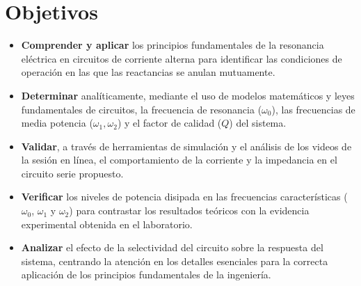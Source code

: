 \section{Objetivos}

\begin{itemize}
	\item \textbf{Comprender y aplicar} los principios fundamentales de la resonancia eléctrica en circuitos de corriente alterna para identificar las condiciones de operación en las que las reactancias se anulan mutuamente.
	
	\item \textbf{Determinar} analíticamente, mediante el uso de modelos matemáticos y leyes fundamentales de circuitos, la frecuencia de resonancia ($\omega_0$), las frecuencias de media potencia ($\omega_1, \omega_2$) y el factor de calidad ($Q$) del sistema.
	
	\item \textbf{Validar}, a través de herramientas de simulación y el análisis de los videos de la sesión en línea, el comportamiento de la corriente y la impedancia en el circuito serie propuesto.
	
	\item \textbf{Verificar} los niveles de potencia disipada en las frecuencias características ($\omega_0$, $\omega_1$ y $\omega_2$) para contrastar los resultados teóricos con la evidencia experimental obtenida en el laboratorio.
	
	\item \textbf{Analizar} el efecto de la selectividad del circuito sobre la respuesta del sistema, centrando la atención en los detalles esenciales para la correcta aplicación de los principios fundamentales de la ingeniería.
\end{itemize}